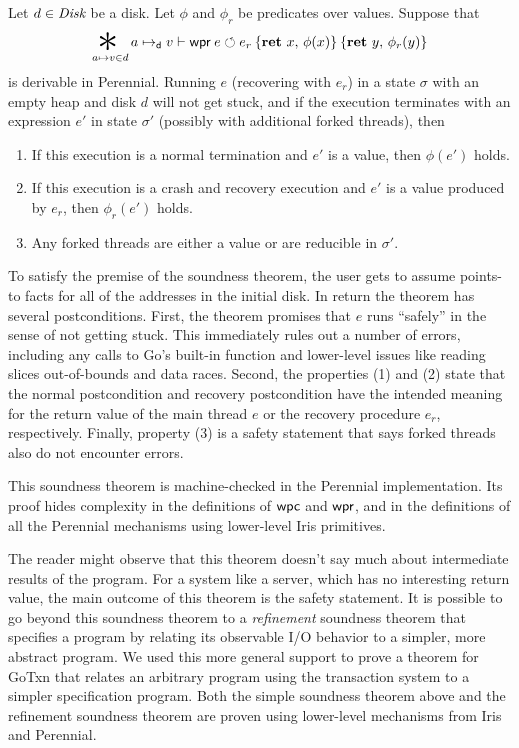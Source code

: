 \begin{theorem}
\label{thm:soundness}
  Let $d \in \textit{Disk}$ be a disk. Let $\phi$ and $\phi_r$ be predicates over
  values.
  Suppose that
  \[\bigast\limits_{a \mapsto v \in d} a \dmapsto v \proves
  \wpr{e}{e_r}{\Ret{x} \phi(x)}{\Ret{y} \phi_{r}(y)} \] is derivable in
  Perennial. Running $e$ (recovering with $e_{r}$) in a state $\sigma$ with an
  empty heap and disk $d$ will not get stuck, and if the execution
  terminates with an expression $e'$ in state $\sigma'$ (possibly
  with additional forked threads), then
  \begin{enumerate}
    \item If this execution is a normal termination and $e'$ is a value, then
    $\phi(e')$ holds.
    \item If this execution is a crash and recovery execution and $e'$ is a
    value produced by $e_{r}$, then $\phi_{r}(e')$ holds.
    \item Any forked threads are either a value or are reducible in $\sigma'$.
  \end{enumerate}
\end{theorem}
To satisfy the premise of the soundness theorem, the user gets to assume points-to
facts for all of the addresses in the initial disk. In return the theorem has
several postconditions. First, the theorem promises
that $e$ runs ``safely'' in the sense of not getting stuck. This immediately
rules out a number of errors, including any calls to Go's built-in 
function and lower-level issues like reading slices out-of-bounds and data
races.  Second, the properties (1) and (2) state that the normal postcondition and
recovery postcondition have the intended meaning for the return value of the
main thread $e$ or the recovery procedure $e_{r}$, respectively. Finally,
property (3) is a safety statement that says forked threads also do not
encounter errors.

This soundness theorem is machine-checked in the Perennial implementation. Its
proof hides complexity in the definitions of $\textsf{\upshape wpc}$ and $\textsf{\upshape wpr}$, and in the
definitions of all the Perennial mechanisms using lower-level Iris primitives.

The reader might observe that this theorem doesn't say much about intermediate
results of the program. For a system like a server, which has no interesting
return value, the main outcome of this theorem is the safety statement.
It is possible to go beyond this soundness theorem to a \emph{refinement}
soundness theorem that specifies a program by relating its observable I/O
behavior to a simpler, more abstract program. We used this more general support
to prove a theorem for GoTxn that relates an arbitrary program using the
transaction system to a simpler specification program. Both the simple soundness
theorem above and the refinement soundness theorem are proven using lower-level
mechanisms from Iris and Perennial.


